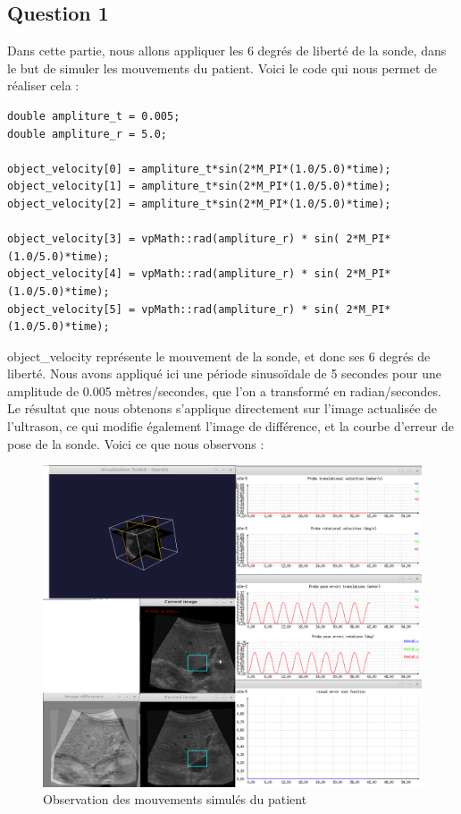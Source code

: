 \documentclass[a4paper,11pt]{article}
\begin{document}
\subsection{Question 1}
Dans cette partie, nous allons appliquer les 6 degr\'es de libert\'e de la sonde, dans le but de simuler les mouvements du patient. Voici le code qui nous permet de r\'ealiser cela :
\begin{verbatim}
double ampliture_t = 0.005;
double ampliture_r = 5.0;

object_velocity[0] = ampliture_t*sin(2*M_PI*(1.0/5.0)*time);
object_velocity[1] = ampliture_t*sin(2*M_PI*(1.0/5.0)*time);
object_velocity[2] = ampliture_t*sin(2*M_PI*(1.0/5.0)*time);

object_velocity[3] = vpMath::rad(ampliture_r) * sin( 2*M_PI*(1.0/5.0)*time);
object_velocity[4] = vpMath::rad(ampliture_r) * sin( 2*M_PI*(1.0/5.0)*time);
object_velocity[5] = vpMath::rad(ampliture_r) * sin( 2*M_PI*(1.0/5.0)*time);
\end{verbatim}

object\_velocity repr\'esente le mouvement de la sonde, et donc ses 6 degr\'es de libert\'e. Nous avons appliqu\'e ici une p\'eriode sinuso\"idale de 5 secondes pour une amplitude de 0.005 m\`etres/secondes, que l'on a transform\'e en radian/secondes.\\

Le r\'esultat que nous obtenons s'applique directement sur l'image actualis\'ee de l'ultrason, ce qui modifie \'egalement l'image de diff\'erence, et la courbe d'erreur de pose de la sonde. Voici ce que nous observons :
\begin{figure}[!h]
	\centering
		\includegraphics[width=1.0\textwidth]{./images/question1.png}
	\caption{Observation des mouvements simul\'es du patient}
	\label{mvtPatient}
\end{figure}
\end{document}
